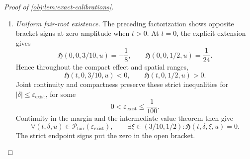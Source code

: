 \documentclass[11pt]{article}
\begin{document}
\begin{proof}[Proof of \cref{obj:lem:exact-calibrations}]
\begin{enumerate}
We also need position independence at zero amplitude. The sign moments are
\[
EZ_u=0,\qquad EZ_u^2
=\cos^2(\pi u/2)+\sin^2(\pi u/2)=1.
\]
Differentiating the averaged risk twice in amplitude gives
\[
\left.
\partial_\delta^2 E\mathsf G(t,\xi+\delta Z_u)
\right|_{\delta=0}
=
-\frac{2e^td}{(1+d\xi)^3}.
\]
The comparator term has no spatial argument, so
\[
\partial_\delta^2
\mathcal R_{\mathrm{fair}}(t,0,\xi,u)
=
\partial_\delta^2
\mathcal R_{\mathrm{fair}}(t,0,\xi,0).
\]
Their effect derivatives agree as well, including at the endpoints of the effect interval by smoothness and the one-sided derivative there. Substitution in the double integral proves
\[
\mathfrak H(t,0,\xi,u)=\mathfrak H(t,0,\xi,0).
\]

For zero effect, differentiation of the explicit comparator gives
\[
\partial_t\mathsf T(0,\delta)=1-\frac{\delta^2}{6/25},
\qquad
\partial_t\mathsf G(0,\xi)=\xi(1-\xi).
\]
Using the two sign moments,
\[
\partial_t\mathcal R_{\mathrm{fair}}(0,\delta,\xi,u)
=
\delta^2\left(-1+\frac{\xi(1-\xi)}{6/25}\right).
\]
Differentiate the undivided Taylor identity at \(t=0\). For \(\delta\ne0\), cancellation of \(\delta^2\) gives the first identity below; continuity in \(\delta\) supplies the same identity at \(\delta=0\):
\[
\mathfrak H(0,\delta,\xi,u)
=-1+\frac{\xi(1-\xi)}{6/25},
\qquad
\mathfrak H(0,\delta,\xi,u)=0
\ \Longleftrightarrow\
(\xi-\tfrac25)(\xi-\tfrac35)=0.
\]
Within \((3/10,1/2)\), the zero is therefore \(p_*\).
Combining these facts yields
\[
\mathfrak H(t,0,p_*,u)=0,
\qquad
\mathfrak H(t,0,\xi,u)=0,\quad \xi\in(3/10,1/2)
\ \Longrightarrow\ \xi=p_*.
\]
Here \(t=0\) uses the explicit quadratic formula, and \(t>0\) uses the negative residual factor.

\item \emph{Uniform fair-root existence.}
The preceding factorization shows opposite bracket signs at zero amplitude when \(t>0\). At \(t=0\), the explicit extension gives
\[
\mathfrak H(0,0,3/10,u)=-\frac18,
\qquad
\mathfrak H(0,0,1/2,u)=\frac1{24}.
\]
Hence throughout the compact effect and spatial ranges,
\[
\mathfrak H(t,0,3/10,u)<0,
\qquad
\mathfrak H(t,0,1/2,u)>0.
\]
Joint continuity and compactness preserve these strict inequalities for
\(|\delta|\le\varepsilon_{\mathrm{exist}}\), for some
\[
0<\varepsilon_{\mathrm{exist}}\le\frac1{100}.
\]
Continuity in the margin and the intermediate value theorem then give
\[
\forall(t,\delta,u)\in
\mathcal P_{\mathrm{fair}}(\varepsilon_{\mathrm{exist}}),
\qquad
\exists\xi\in(3/10,1/2):
\mathfrak H(t,\delta,\xi,u)=0.
\]
The strict endpoint signs put the zero in the open bracket.


\end{enumerate}
\end{proof}
\end{document}
